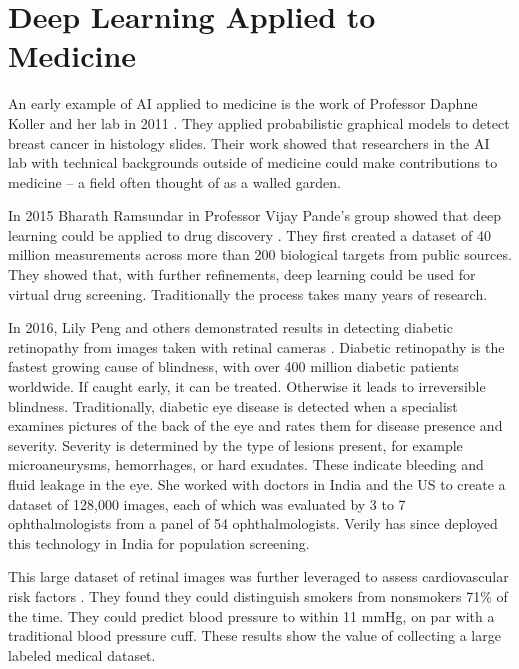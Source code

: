 \chapter{Deep Learning Applied to Medicine}


An early example of AI applied to medicine is the work of Professor Daphne Koller and her lab in 2011 \cite{beck2011systematic}.  They applied probabilistic graphical models to detect breast cancer in histology slides.  Their work showed that researchers in the AI lab with technical backgrounds outside of medicine could make contributions to medicine -- a field often thought of as a walled garden.

In 2015 Bharath Ramsundar in Professor Vijay Pande's group showed that deep learning could be applied to drug discovery \cite{ramsundar2015massively}.  They first created a dataset of 40 million measurements across more than 200 biological targets from public sources.  They showed that, with further refinements, deep learning could be used for virtual drug screening.  Traditionally the process takes many years of research.

In 2016, Lily Peng and others demonstrated results in detecting diabetic retinopathy from images taken with retinal cameras \cite{gulshan2016development}.  Diabetic retinopathy is the fastest growing cause of blindness, with over 400 million diabetic patients worldwide.  If caught early, it can be treated.  Otherwise it leads to irreversible blindness.  Traditionally, diabetic eye disease is detected when a specialist examines pictures of the back of the eye and rates them for disease presence and severity. Severity is determined by the type of lesions present, for example microaneurysms, hemorrhages, or hard exudates.  These indicate bleeding and fluid leakage in the eye.  She worked with doctors in India and the US to create a dataset of 128,000 images, each of which was evaluated by 3 to 7 ophthalmologists from a panel of 54 ophthalmologists.  Verily has since deployed this technology in India for population screening.

This large dataset of retinal images was further leveraged to assess cardiovascular risk factors \cite{poplin2018prediction}.  They found they could distinguish smokers from nonsmokers 71\% of the time.  They could predict blood pressure to within 11 mmHg, on par with a traditional blood pressure cuff.  These results show the value of collecting a large labeled medical dataset.


